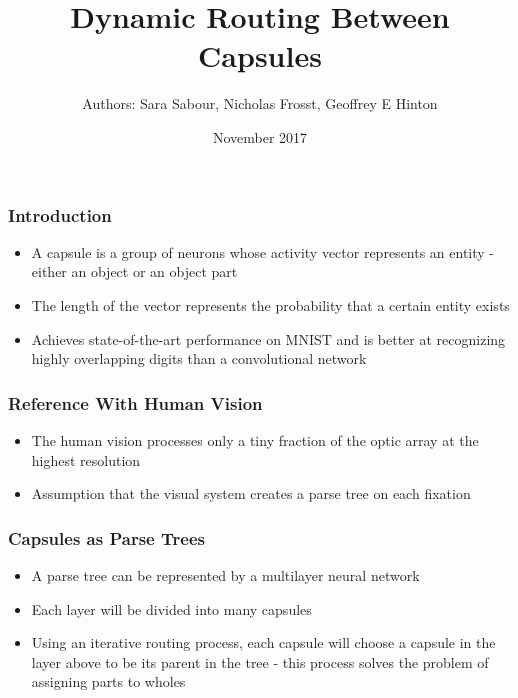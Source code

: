 \documentclass{beamer}
\title[Dynamic Routing Between Capsules]{Dynamic Routing Between Capsules}
\author[Mu\c sat Bogdan-Adrian]{Authors: Sara Sabour, Nicholas Frosst, Geoffrey E Hinton}
\date{November 2017}
\begin{document}
\frame{\titlepage}

\begin{frame}
\frametitle{Introduction}
\center
\begin{itemize}
	\item A capsule is a group of neurons whose activity vector represents an entity - 				  either an object or an object part
	\item The length of the vector represents the probability that a certain entity exists
	\item Achieves state-of-the-art performance on MNIST and is better at recognizing highly 			  overlapping digits than a convolutional network
\end{itemize}
\end{frame}

\begin{frame}
\frametitle{Reference With Human Vision}
\center
\begin{itemize}
	\item The human vision processes only a tiny fraction of the optic array at the highest 			  resolution
	\item Assumption that the visual system creates a parse tree on each fixation
	\begin{figure}
	\subcapcentertrue
    \centering
    \end{figure}
\end{itemize}
\end{frame}

\begin{frame}
\frametitle{Capsules as Parse Trees}
\center
\begin{itemize}
	\item A parse tree can be represented by a multilayer neural network
	\item Each layer will be divided into many capsules
	\item Using an iterative routing process, each capsule will choose a capsule in the layer above to be its parent in the tree - this process solves the problem of assigning parts to wholes
\end{itemize}
\end{frame}
\end{document}
